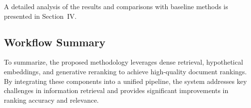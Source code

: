 A detailed analysis of the results and comparisons with baseline methods is presented in Section~IV.

\subsection{Workflow Summary}
To summarize, the proposed methodology leverages dense retrieval, hypothetical embeddings, and generative reranking to achieve high-quality document rankings. By integrating these components into a unified pipeline, the system addresses key challenges in information retrieval and provides significant improvements in ranking accuracy and relevance.
